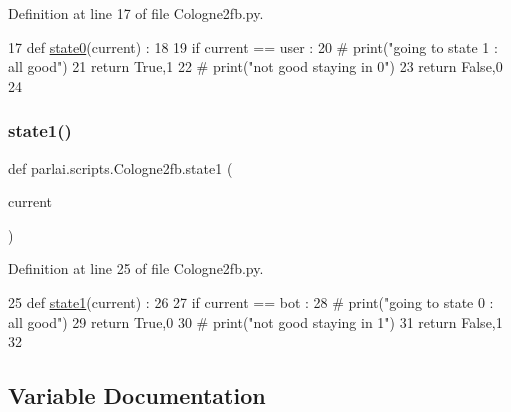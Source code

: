 Definition at line 17 of file Cologne2fb.\+py.


\begin{DoxyCode}
17 \textcolor{keyword}{def }\hyperlink{namespaceparlai_1_1scripts_1_1Cologne2fb_ac765067cc58a95632761e7cf25d552ca}{state0}(current) : 
18 
19     \textcolor{keywordflow}{if} current == user :
20         \textcolor{comment}{# print("going to state 1 : all good")}
21         \textcolor{keywordflow}{return} \textcolor{keyword}{True},1 
22     \textcolor{comment}{# print("not good staying in 0")}
23     \textcolor{keywordflow}{return} \textcolor{keyword}{False},0
24 
\end{DoxyCode}
\mbox{\label{namespaceparlai_1_1scripts_1_1Cologne2fb_a54d10b54a93975b9903bd789aa2b5b91}} 
\subsubsection{\texorpdfstring{state1()}{state1()}}
{\footnotesize\ttfamily def parlai.\+scripts.\+Cologne2fb.\+state1 (\begin{DoxyParamCaption}\item[{}]{current }\end{DoxyParamCaption})}



Definition at line 25 of file Cologne2fb.\+py.


\begin{DoxyCode}
25 \textcolor{keyword}{def }\hyperlink{namespaceparlai_1_1scripts_1_1Cologne2fb_a54d10b54a93975b9903bd789aa2b5b91}{state1}(current) : 
26 
27     \textcolor{keywordflow}{if} current == bot :
28         \textcolor{comment}{# print("going to state 0 : all good")}
29         \textcolor{keywordflow}{return} \textcolor{keyword}{True},0 
30     \textcolor{comment}{# print("not good staying in 1")}
31     \textcolor{keywordflow}{return} \textcolor{keyword}{False},1
32 
\end{DoxyCode}


\subsection{Variable Documentation}
\mbox{\label{namespaceparlai_1_1scripts_1_1Cologne2fb_a2daa0c10243dae832a8f536c1af3f401}} 

